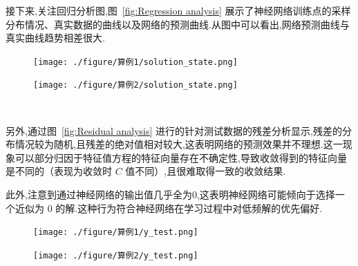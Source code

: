 \documentclass{Sichuan Normal University}
\begin{document}
    接下来,关注回归分析图,图~\ref{fig:Regression analysis} 展示了神经网络训练点的采样分布情况、真实数据的曲线以及网络的预测曲线.从图中可以看出,网络预测曲线与真实曲线趋势相差很大.
\begin{figure}[H]
    \centering
    \begin{minipage}[c]{0.48\textwidth}
    \centering
    \texttt{[image: ./figure/算例1/solution\_state.png]}
    \end{minipage}
    \hspace{0.02\textwidth}
    \begin{minipage}[c]{0.48\textwidth}
    \centering
    \texttt{[image: ./figure/算例2/solution\_state.png]}
    \end{minipage}\\[3mm]
    \begin{minipage}[t]{0.48\textwidth}
    \centering
    \label{fig:Regression analysis}
    \end{minipage}
    \hspace{0.02\textwidth}
    \begin{minipage}[t]{0.48\textwidth}
    \centering
    \label{fig:Regression analysis2}
    \end{minipage}
    \end{figure}
    另外,通过图~\ref{fig:Residual analysis} 进行的针对测试数据的残差分析显示,残差的分布情况较为随机,且残差的绝对值相对较大,这表明网络的预测效果并不理想.这一现象可以部分归因于特征值方程的特征向量存在不确定性,导致收敛得到的特征向量是不同的（表现为收敛时 $C$ 值不同）,且很难取得一致的收敛结果.

    此外,注意到通过神经网络的输出值几乎全为$0$,这表明神经网络可能倾向于选择一个近似为 $0$ 的解.这种行为符合神经网络在学习过程中对低频解的优先偏好.
\begin{figure}[H]
    \centering
    \begin{minipage}[c]{0.48\textwidth}
    \centering
    \texttt{[image: ./figure/算例1/y\_test.png]}
    \end{minipage}
    \hspace{0.02\textwidth}
    \begin{minipage}[c]{0.48\textwidth}
    \centering
    \texttt{[image: ./figure/算例2/y\_test.png]}
    \end{minipage}\\[3mm]
    \begin{minipage}[t]{0.48\textwidth}
    \centering
    \label{fig:Residual analysis}
    \end{minipage}
    \hspace{0.02\textwidth}
    \begin{minipage}[t]{0.48\textwidth}
    \centering
    \label{fig:Residual analysis2}
    \end{minipage}
    \end{figure}
\end{document}
